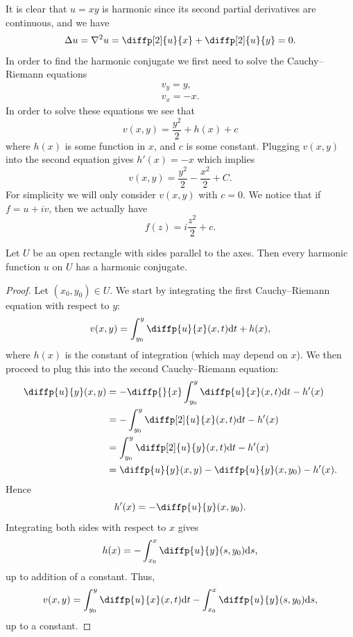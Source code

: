\documentclass[11pt,a4paper]{article}
\begin{document}
\begin{example}
  It is clear that $u = xy$ is harmonic since its second partial derivatives
  are continuous, and we have
  \[
    \Delta u = \nabla^2 u = \diffp[2]{u}{x} + \diffp[2]{u}{y} = 0.
  \]
  In order to find the harmonic conjugate we first need to solve the
  Cauchy--Riemann equations
  \begin{gather*}
    v_y = y, \\
    v_x = -x.
  \end{gather*}
  In order to solve these equations we see that
  \[
    v(x,y) = \frac{y^2}{2} + h(x) + c
  \]
  where $h(x)$ is some function in $x$, and $c$ is some constant.
  Plugging $v(x,y)$ into the second equation gives $h'(x) = -x$ which implies
  \[
     v(x,y) = \frac{y^2}{2} - \frac{x^2}{2} + C.
  \]
  For simplicity we will only consider $v(x,y)$ with $c = 0$.
  We notice that if $f = u + i v$, then we actually have
  \[
    f(z) = i \frac{z^2}{2} + c.
  \]
\end{example}

\begin{proposition}
  \label{prop:harmonic-on-rectangle}
  Let $U$ be an open rectangle with sides parallel to the axes.
  Then every harmonic function $u$ on $U$ has a harmonic conjugate.
\end{proposition}
\begin{proof}
  Let $(x_0,y_0) \in U$.
  We start by integrating the first Cauchy--Riemann equation
  with respect to $y$:
  \[
    v(x,y) = \int_{y_0}^{y} \diffp{u}{x}(x,t) \dt + h(x),
  \]
  where $h(x)$ is the constant of integration (which may depend on $x$).
  We then proceed to plug this into the second Cauchy--Riemann equation:
  \begin{align*}
    \diffp{u}{y}(x,y) &=
    -\diffp{}{x} \int_{y_0}^{y} \diffp{u}{x}(x,t)\dt - h'(x) \\ &=
    -\int_{y_0}^{y} \diffp[2]{u}{x}(x,t)\dt - h'(x) \\ &=
    \int_{y_0}^{y} \diffp[2]{u}{y}(x,t)\dt - h'(x) \\ &=
    \diffp{u}{y}(x,y) - \diffp{u}{y}(x,y_0) - h'(x).
  \end{align*}
  Hence
  \[
    h'(x) = - \diffp{u}{y}(x,y_0).
  \]
  Integrating both sides with respect to $x$ gives
  \[
    h(x) = - \int_{x_0}^{x} \diffp{u}{y} (s,y_0) \ds,
  \]
  up to addition of a constant.
  Thus,
  \[
    v(x,y) =
    \int_{y_0}^{y} \diffp{u}{x}(x,t) \dt -
    \int_{x_0}^{x} \diffp{u}{y} (s,y_0) \ds,
  \]
  up to a constant.
\end{proof}
\end{document}
